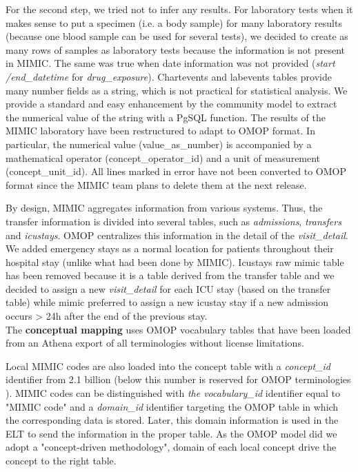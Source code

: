 For the second step, we tried not to infer any results. For laboratory tests when 
it makes sense to put a specimen (i.e. a body sample) for many laboratory results 
(because one blood sample can be used for several tests), we decided to create as 
many rows of samples as laboratory tests because the information is not present 
in MIMIC. The same was true when date information was not provided (\textit{start
/end\_datetime} for \textit{drug\_exposure}).
Chartevents and labevents tables provide many number fields as a string, which is 
not practical for statistical analysis. We provide a standard and easy enhancement 
by the community model to extract the numerical value of the string with a PgSQL 
function. The results of the MIMIC laboratory have been restructured to adapt to 
OMOP format. In particular, the numerical value (value\_as\_number) is accompanied 
by a mathematical operator (concept\_operator\_id) and a unit of measurement 
(concept\_unit\_id). All lines marked in error have not been converted to OMOP 
format since the MIMIC team plans to delete them at the next release.

By design, MIMIC aggregates information from various systems\cite{mimic-omop}.
Thus, the transfer information is divided into several tables, such as
\textit{admissions}, \textit{transfers} and \textit{icustays}. OMOP centralizes
this information in the detail of the \textit{visit\_detail}. 
We added emergency stays as a normal location for patients throughout their 
hospital stay (unlike what had been done by MIMIC). Icustays raw mimic table has 
been removed because it is a table derived from the transfer table \cite{icustays-doc} 
and we decided to assign a new \textit{visit\_detail} for each ICU stay (based on 
the transfer table) while mimic preferred to assign a new icustay stay if a new 
admission occurs > 24h after the end of the previous stay.
\\


The \textbf{conceptual mapping} uses OMOP vocabulary tables that have 
been loaded from an Athena export \cite{ohdsi-athena} of all terminologies 
without license limitations.

Local MIMIC codes are also loaded into the concept table with a \textit{concept\_id}
identifier from 2.1 billion (below this number is reserved for OMOP 
terminologies \cite{omop-documentation-pdf}). 
MIMIC codes can be distinguished with \textit{the vocabulary\_id} identifier equal 
to "MIMIC code" and a \textit{domain\_id} identifier targeting the OMOP table in 
which the corresponding data is stored. Later, this domain information 
is used in the ELT to send the information in the proper table. As the OMOP model 
did we adopt a "concept-driven methodology", domain of each local concept drive 
the concept to the right table.

